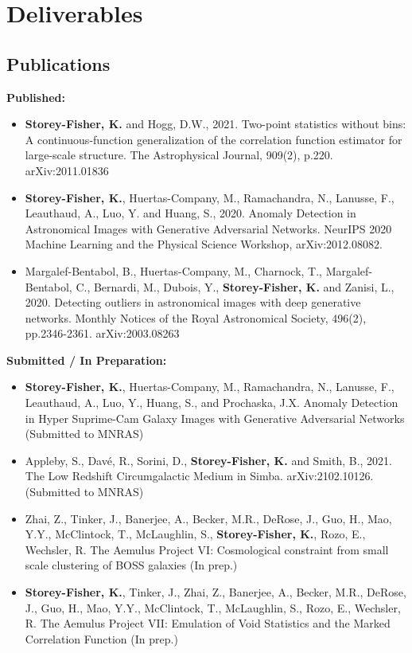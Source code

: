 \documentclass{article}
\begin{document}
\section{Deliverables}
\label{sec:deliverables}

\subsection{Publications}
\label{sec:pubs}

\textbf{Published:}
\begin{itemize}
\item \textbf{Storey-Fisher, K.} and Hogg, D.W., 2021. Two-point statistics without bins: A continuous-function generalization of the correlation function estimator for large-scale structure. The Astrophysical Journal, 909(2), p.220. arXiv:2011.01836
\item \textbf{Storey-Fisher, K.}, Huertas-Company, M., Ramachandra, N., Lanusse, F., Leauthaud, A., Luo, Y. and Huang, S., 2020. Anomaly Detection in Astronomical Images with Generative Adversarial Networks. NeurIPS 2020 Machine Learning and the Physical Science Workshop, arXiv:2012.08082.
\item Margalef-Bentabol, B., Huertas-Company, M., Charnock, T., Margalef-Bentabol, C., Bernardi, M., Dubois, Y.,\textbf{ Storey-Fisher, K.} and Zanisi, L., 2020. Detecting outliers in astronomical images with deep generative networks. Monthly Notices of the Royal Astronomical Society, 496(2), pp.2346-2361. arXiv:2003.08263
\end{itemize}

\noindent \textbf{Submitted / In Preparation:}
\begin{itemize}
\item \textbf{Storey-Fisher, K.}, Huertas-Company, M., Ramachandra, N., Lanusse, F., Leauthaud, A., Luo, Y., Huang, S., and Prochaska, J.X. Anomaly Detection in Hyper Suprime-Cam Galaxy Images with Generative Adversarial Networks (Submitted to MNRAS)
\item Appleby, S., Davé, R., Sorini, D., \textbf{Storey-Fisher, K.} and Smith, B., 2021. The Low Redshift Circumgalactic Medium in Simba. arXiv:2102.10126. (Submitted to MNRAS)
\item Zhai, Z., Tinker, J., Banerjee, A., Becker, M.R., DeRose, J., Guo, H., Mao, Y.Y., McClintock, T., McLaughlin, S.,  \textbf{Storey-Fisher, K.}, Rozo, E., Wechsler, R. The Aemulus Project VI: Cosmological constraint from small scale clustering of BOSS galaxies (In prep.)
\item \textbf{Storey-Fisher, K.}, Tinker, J., Zhai, Z., Banerjee, A., Becker, M.R., DeRose, J., Guo, H., Mao, Y.Y., McClintock, T., McLaughlin, S., Rozo, E., Wechsler, R. The Aemulus Project VII: Emulation of Void Statistics and the Marked Correlation Function (In prep.)
\end{itemize}
\end{document}

